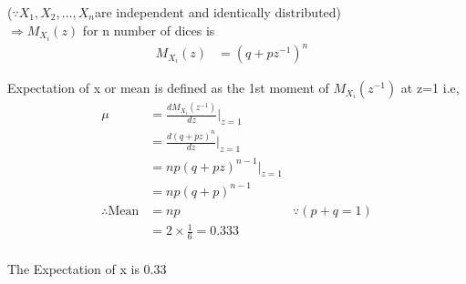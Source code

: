 \documentclass[a4paper,10pt,two column]{article}
\begin{document}
($\because X_1,X_2,...,X_n$are independent and identically distributed)
\\

$\Rightarrow M_{X_i}(z)$ for n number of dices is
\begin{align}
 M_{X_i}(z)&= (q + pz^{-1})^n&
\end{align}

Expectation of x or mean is defined as the 1st moment of $M_{X_i}(z^{-1})$ at z=1 i.e,
\begin{align}
\mu&= \frac{dM_{X_i}(z^{-1})}{dz}|_{z=1}&
\\
&= \frac{d(q + pz)^n}{dz}|_{z=1}&
\\
&=np(q + pz)^{n-1}|_{z=1}&
\\
&= np(q + p)^{n-1}&
\\
\therefore \text{Mean} &= np& {}\because(p+q=1)
\\
&= 2\times\frac{1}{6}= 0.333&
\end{align}
\\

The Expectation of x  is $0.33$
\\
\end{document}
